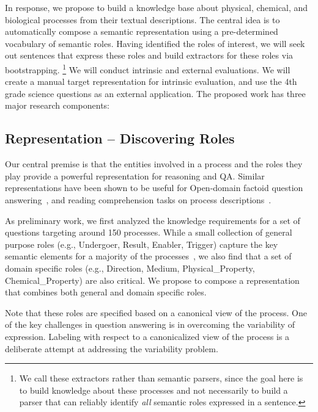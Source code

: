 In response, we propose to build a knowledge base about physical, chemical, and biological processes from their textual descriptions. 
The central idea is to automatically compose a semantic representation using a pre-determined vocabulary of semantic roles. 
Having identified the roles of interest, we will seek out sentences that express these roles and build extractors for these roles via bootstrapping.
\footnote{
We call these extractors rather than semantic parsers, since the goal here is to build knowledge about these processes and 
not necessarily to build a parser that can reliably identify {\em all} semantic roles expressed in a sentence.} 
We will conduct intrinsic and external evaluations. 
We will create a manual target representation for intrinsic evaluation, and use the 4th grade science questions as an external application.
The proposed work has three major research components:

\subsection{Representation -- Discovering Roles}

Our central premise is that the entities involved in a process and the roles they play provide a powerful representation for reasoning and QA. 
Similar representations have been shown to be useful for Open-domain factoid question answering~\cite{shen2007using,pizzato2008indexing}, 
and reading comprehension tasks on process descriptions~\cite{berantSrikumar14}.

As preliminary work, we first analyzed the knowledge requirements for a set of questions targeting around 150 processes. 
While a small collection of general purpose roles (e.g., Undergoer, Result, Enabler, Trigger) capture the key semantic elements for a 
majority of the processes~\cite{louvan2015:kcap}, we also find that a set of domain specific roles (e.g., Direction, Medium, Physical\_Property, Chemical\_Property) are also critical. We propose to compose a representation that combines both general and domain specific roles. 

Note that these roles are specified based on a canonical view of the process. One of the key challenges in question answering is in overcoming the variability of expression. Labeling with respect to a canonicalized view of the process is a deliberate attempt at addressing the variability problem. 

